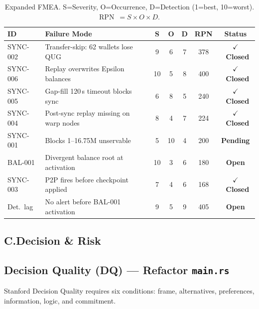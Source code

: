 \documentclass[12pt,a4paper]{article}
\newcommand{\statusopen}{\textcolor{qred}{\bfseries Open}}
\newcommand{\statusclosed}{\textcolor{qgreen}{\bfseries $\checkmark$~Closed}}
\newcommand{\statuspending}{\textcolor{qorange}{\bfseries Pending}}
\begin{document}
\begin{table}[H]
\centering
\small
\begin{tabularx}{\linewidth}{lXccccc}
\toprule
\textbf{ID} & \textbf{Failure Mode} & \textbf{S} & \textbf{O} & \textbf{D} & \textbf{RPN} & \textbf{Status} \\
\midrule
SYNC-002 & Transfer-skip: 62 wallets lose QUG &
  9 & 6 & 7 & \textcolor{qred}{378} & \statusclosed \\
\rowcolor{rowgray}
SYNC-006 & Replay overwrites Epsilon balances &
  10 & 5 & 8 & \textcolor{qred}{400} & \statusclosed \\
SYNC-005 & Gap-fill 120\,s timeout blocks sync &
  6 & 8 & 5 & \textcolor{qred}{240} & \statusclosed \\
\rowcolor{rowgray}
SYNC-004 & Post-sync replay missing on warp nodes &
  8 & 4 & 7 & \textcolor{qorange}{224} & \statusclosed \\
SYNC-001 & Blocks 1--16.75M unservable &
  5 & 10 & 4 & \textcolor{qorange}{200} & \statuspending \\
\rowcolor{rowgray}
BAL-001 & Divergent balance root at activation &
  10 & 3 & 6 & \textcolor{qorange}{180} & \statusopen \\
SYNC-003 & P2P fires before checkpoint applied &
  7 & 4 & 6 & \textcolor{qorange}{168} & \statusclosed \\
\rowcolor{rowgray}
Det.\ lag & No alert before BAL-001 activation &
  9 & 5 & 9 & \textcolor{qred}{405} & \statusopen \\
\bottomrule
\end{tabularx}
\caption{Expanded FMEA. S=Severity, O=Occurrence, D=Detection (1=best, 10=worst).
  RPN~$= S \times O \times D$.}
\end{table}

\subsection*{C.\enspace Decision \& Risk}

\subsection{Decision Quality (DQ) --- Refactor \texttt{main.rs}}

Stanford Decision Quality requires six conditions: frame, alternatives,
preferences, information, logic, and commitment.
\end{document}
